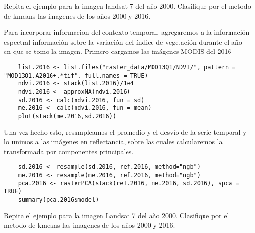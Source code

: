 \begin{act}
  Repita el ejemplo para la imagen landsat 7 del año 2000. Clasifique por el metodo de kmeans las imagenes de los años 2000 y 2016.
\end{act}

\begin{exa}
  Para incorporar informacion del contexto temporal, agregaremos a la informaci\'on espectral informaci\'on sobre la variaci\'on del \'indice de vegetaci\'on durante el año en que se tomo la imagen. Primero cargamos las im\'agenes MODIS del 2016

  \begin{lstlisting}
    list.2016 <- list.files("raster_data/MOD13Q1/NDVI/", pattern = "MOD13Q1.A2016+.*tif", full.names = TRUE)
    ndvi.2016 <- stack(list.2016)/1e4
    ndvi.2016 <- approxNA(ndvi.2016)
    sd.2016 <- calc(ndvi.2016, fun = sd)
    me.2016 <- calc(ndvi.2016, fun = mean)
    plot(stack(me.2016,sd.2016))
  \end{lstlisting}

  Una vez hecho esto, resampleamos el promedio y el desv\'io de la serie temporal y lo unimos a las im\'agenes en reflectancia, sobre las cuales calcularemos la transformada por componentes principales.

  \begin{lstlisting}
    sd.2016 <- resample(sd.2016, ref.2016, method="ngb")
    me.2016 <- resample(me.2016, ref.2016, method="ngb")
    pca.2016 <- rasterPCA(stack(ref.2016, me.2016, sd.2016), spca = TRUE)
    summary(pca.2016$model)
  \end{lstlisting}
\end{exa}

\begin{act}
  Repita el ejemplo para la imagen Landsat 7 del año 2000. Clasifique por el metodo de kmeans las imagenes de los años 2000 y 2016.
\end{act}

